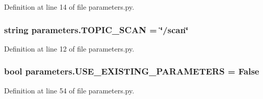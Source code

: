 Definition at line 14 of file parameters.\+py.

\subsubsection[{\texorpdfstring{T\+O\+P\+I\+C\+\_\+\+S\+C\+AN}{TOPIC_SCAN}}]{\setlength{\rightskip}{0pt plus 5cm}string parameters.\+T\+O\+P\+I\+C\+\_\+\+S\+C\+AN = \char`\"{}/scan\char`\"{}}\hypertarget{namespaceparameters_a28de242cdbba10666eb0c95aaef6812b}{}\label{namespaceparameters_a28de242cdbba10666eb0c95aaef6812b}


Definition at line 12 of file parameters.\+py.

\subsubsection[{\texorpdfstring{U\+S\+E\+\_\+\+E\+X\+I\+S\+T\+I\+N\+G\+\_\+\+P\+A\+R\+A\+M\+E\+T\+E\+RS}{USE_EXISTING_PARAMETERS}}]{\setlength{\rightskip}{0pt plus 5cm}bool parameters.\+U\+S\+E\+\_\+\+E\+X\+I\+S\+T\+I\+N\+G\+\_\+\+P\+A\+R\+A\+M\+E\+T\+E\+RS = False}\hypertarget{namespaceparameters_a0cffcb215ac12a1700baedb1a13ec8d5}{}\label{namespaceparameters_a0cffcb215ac12a1700baedb1a13ec8d5}


Definition at line 54 of file parameters.\+py.

